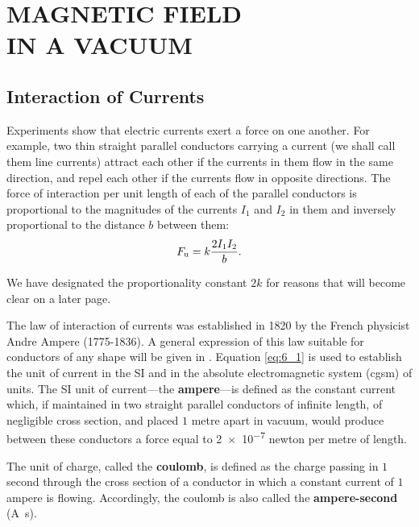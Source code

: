 

\chapter[MAGNETIC FIELD IN A VACUUM]{MAGNETIC FIELD\\ IN A VACUUM}\label{chap:6}

\section{Interaction of Currents}\label{sec:6_1}

Experiments show that electric currents exert a force on one another. For example, two thin straight parallel conductors carrying a current (we shall call them line currents) attract each other if the currents in them flow in the same direction, and repel each other if the currents flow in opposite directions. The force of interaction per unit length of each of the parallel conductors is proportional to the magnitudes of the currents $I_1$ and $I_2$ in them and inversely proportional to the distance $b$ between them:
\begin{equation}\label{eq:6_1}
    F_{\text{u}} = k \frac{2 I_1 I_2}{b}.
\end{equation}

\noindent
We have designated the proportionality constant $2k$ for reasons that will become clear on a later page.

The law of interaction of currents was established in 1820 by the French physicist Andre Ampere (1775-1836). A general expression of this law suitable for conductors of any shape will be given in . Equation \eqref{eq:6_1} is used to establish the unit of current in the SI and in the absolute electromagnetic system (cgsm) of units. The SI unit of current---the \textbf{ampere}---is defined as the constant current which, if maintained in two straight parallel conductors of infinite length, of negligible cross section, and placed $1$ metre apart in vacuum, would produce between these conductors a force equal to \num{2e-7} newton per metre of length.

The unit of charge, called the \textbf{coulomb}, is defined as the charge passing in $1$ second through the cross section of a conductor in which a constant current of $1$ ampere is flowing. Accordingly, the coulomb is also called the \textbf{ampere-second} (\si{\ampere\second}).


